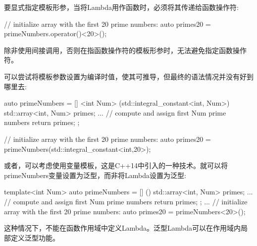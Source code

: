 要显式指定模板形参，当将Lambda用作函数时，必须将其传递给函数操作符:

\begin{cpp}
// initialize array with the first 20 prime numbers:
auto primes20 = primeNumbers.operator()<20>();
\end{cpp}

除非使用间接调用，否则在指函数操作符的模板形参时，无法避免指定函数操作符。

可以尝试将模板参数设置为编译时值，使其可推导，但最终的语法情况并没有好到哪里去:

\begin{cpp}
auto primeNumbers = [] <int Num> (std::integral_constant<int, Num>) {
						std::array<int, Num> primes{};
						... // compute and assign first Num prime numbers
						return primes;
					};

// initialize array with the first 20 prime numbers:
auto primes20 = primeNumbers(std::integral_constant<int,20>{});
\end{cpp}

或者，可以考虑使用变量模板，这是C++14中引入的一种技术。就可以将primeNumbers变量设置为泛型，而非将Lambda设置为泛型:

\begin{cpp}
template<int Num>
auto primeNumbers = [] () {
						std::array<int, Num> primes{};
						... // compute and assign first Num prime numbers
						return primes;
					};
...
// initialize array with the first 20 prime numbers:
auto primes20 = primeNumbers<20>();
\end{cpp}

这种情况下，不能在函数作用域中定义Lambda。泛型Lambda可以在作用域内局部定义泛型功能。








